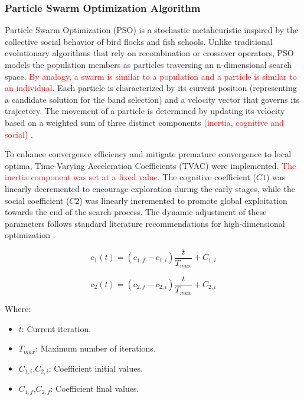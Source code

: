 \documentclass[aipa,article,submit,pdftex,moreauthors]{Definitions/mdpi}
\begin{document}
\subsubsection{Particle Swarm Optimization Algorithm}
Particle Swarm Optimization (PSO) is a stochastic metaheuristic inspired by the collective social behavior of bird flocks and fish schools. 
Unlike traditional evolutionary algorithms that rely on recombination or crossover operators, PSO models the population members as particles traversing an n-dimensional search space. \textcolor{red}{By analogy, a swarm is similar to a population and a particle is similar to an individual.}   
Each particle is characterized by its current position (representing a candidate solution for the band selection) and a velocity vector that governs its trajectory. 
The movement of a particle is determined by updating its velocity based on a weighted sum of three distinct components \textcolor{red}{(inertia, cognitive and social)} \cite{eiben_introduction_2015}.

To enhance convergence efficiency and mitigate premature convergence to local optima, Time-Varying Acceleration Coefficients (TVAC) were implemented. \textcolor{red}{The inertia component was set at a fixed value.}
The cognitive coefficient ($C1$) was linearly decremented to encourage exploration during the early stages, while the social coefficient ($C2$) was linearly incremented to promote global exploitation towards the end of the search process. 
The dynamic adjustment of these parameters follows standard literature recommendations for high-dimensional optimization \cite{ratnaweera_self-organizing_2004}. 

\begin{equation}
    c_1(t)=(c_{1,f}-c_{1,i}) \frac{t}{T_{max}}+C_{1,i}
\end{equation}

\begin{equation}
    c_2(t)=(c_{2,f}-c_{2,i}) \frac{t}{T_{max}}+C_{2,i}
\end{equation}



Where:
\begin{itemize}
    \item $t$: Current iteration.
    \item $T_{max}$: Maximum number of iterations.
    \item $C_{1,i}$,$C_{2,i}$: Coefficient initial values.
    \item $C_{1,f}$,$C_{2,f}$: Coefficient final values.
\end{itemize}
\end{document}
